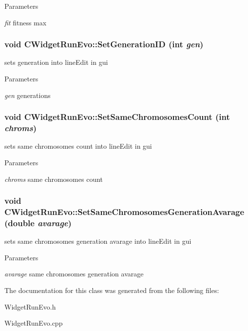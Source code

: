 \begin{DoxyParams}{Parameters}
\item[{\em fit}]fitness max \end{DoxyParams}
\hypertarget{classCWidgetRunEvo_abdd9364c205077d89a8b035bde281333}{
\subsubsection[{SetGenerationID}]{\setlength{\rightskip}{0pt plus 5cm}void CWidgetRunEvo::SetGenerationID (int {\em gen})}}
\label{classCWidgetRunEvo_abdd9364c205077d89a8b035bde281333}
sets generation into lineEdit in gui


\begin{DoxyParams}{Parameters}
\item[{\em gen}]generations \end{DoxyParams}
\hypertarget{classCWidgetRunEvo_a672696ba23b4a364537f778e6d76bb43}{
\subsubsection[{SetSameChromosomesCount}]{\setlength{\rightskip}{0pt plus 5cm}void CWidgetRunEvo::SetSameChromosomesCount (int {\em chroms})}}
\label{classCWidgetRunEvo_a672696ba23b4a364537f778e6d76bb43}
sets same chromosomes count into lineEdit in gui


\begin{DoxyParams}{Parameters}
\item[{\em chroms}]same chromosomes count \end{DoxyParams}
\hypertarget{classCWidgetRunEvo_af2907467c76427f63289bce49cee1d5a}{
\subsubsection[{SetSameChromosomesGenerationAvarage}]{\setlength{\rightskip}{0pt plus 5cm}void CWidgetRunEvo::SetSameChromosomesGenerationAvarage (double {\em avarage})}}
\label{classCWidgetRunEvo_af2907467c76427f63289bce49cee1d5a}
sets same chromosomes generation avarage into lineEdit in gui


\begin{DoxyParams}{Parameters}
\item[{\em avarage}]same chromosomes generation avarage \end{DoxyParams}


The documentation for this class was generated from the following files:\begin{DoxyCompactItemize}
\item 
WidgetRunEvo.h\item 
WidgetRunEvo.cpp\end{DoxyCompactItemize}
